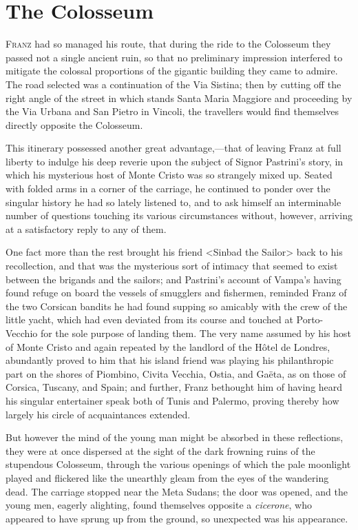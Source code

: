 \chapter{The Colosseum} 

 \lettrine{F}{ranz} had so managed his route, that during the ride to the Colosseum they passed not a single ancient ruin, so that no preliminary impression interfered to mitigate the colossal proportions of the gigantic building they came to admire. The road selected was a continuation of the Via Sistina; then by cutting off the right angle of the street in which stands Santa Maria Maggiore and proceeding by the Via Urbana and San Pietro in Vincoli, the travellers would find themselves directly opposite the Colosseum. 

 This itinerary possessed another great advantage,—that of leaving Franz at full liberty to indulge his deep reverie upon the subject of Signor Pastrini's story, in which his mysterious host of Monte Cristo was so strangely mixed up. Seated with folded arms in a corner of the carriage, he continued to ponder over the singular history he had so lately listened to, and to ask himself an interminable number of questions touching its various circumstances without, however, arriving at a satisfactory reply to any of them. 

 One fact more than the rest brought his friend <Sinbad the Sailor> back to his recollection, and that was the mysterious sort of intimacy that seemed to exist between the brigands and the sailors; and Pastrini's account of Vampa's having found refuge on board the vessels of smugglers and fishermen, reminded Franz of the two Corsican bandits he had found supping so amicably with the crew of the little yacht, which had even deviated from its course and touched at Porto-Vecchio for the sole purpose of landing them. The very name assumed by his host of Monte Cristo and again repeated by the landlord of the Hôtel de Londres, abundantly proved to him that his island friend was playing his philanthropic part on the shores of Piombino, Civita Vecchia, Ostia, and Gaëta, as on those of Corsica, Tuscany, and Spain; and further, Franz bethought him of having heard his singular entertainer speak both of Tunis and Palermo, proving thereby how largely his circle of acquaintances extended. 

 But however the mind of the young man might be absorbed in these reflections, they were at once dispersed at the sight of the dark frowning ruins of the stupendous Colosseum, through the various openings of which the pale moonlight played and flickered like the unearthly gleam from the eyes of the wandering dead. The carriage stopped near the Meta Sudans; the door was opened, and the young men, eagerly alighting, found themselves opposite a \textit{cicerone}, who appeared to have sprung up from the ground, so unexpected was his appearance. 

